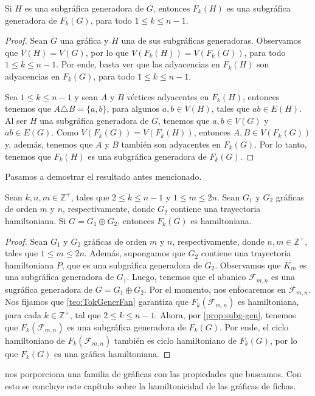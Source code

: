 \begin{proposicion}
\label{prop:subg-gen}
    Si $H$ es una subgr\'afica generadora de $G$, entonces $F_k(H)$ es una
    subgr\'afica generadora de $F_k(G)$, para todo $1 \leq k \leq n-1$.
\end{proposicion}

\begin{proof}
    Sean $G$ una gr\'afica y $H$ una de sus subgr\'aficas generadoras.
    Observamos que $V(H)=V(G)$, por lo que $V(F_k(H))=V(F_k(G))$, para todo $1
    \leq k \leq n-1$. Por ende, basta ver que las adyacencias en $F_k(H)$ son
    adyacencias en $F_k(G)$, para todo $1 \leq k \leq n-1$.

    Sea $1 \leq k \leq n-1$ y sean $A$ y $B$ v\'ertices adyacentes en $F_k(H)$,
    entonces tenemos que $ A \triangle B = \{a,b\}$, para algunos $a,b \in
    V(H)$, tales que $ab \in E(H)$. Al ser $H$ una subgr\'afica generadora de
    $G$, tenemos que $a,b \in V(G)$ y $ab \in E(G)$. Como $V(F_k(G))=V(F_k(H))$,
    entonces $A,B \in V(F_k(G))$ y, adem\'as, tenemos que $A$ y $B$ tambi\'en
    son adyacentes en $F_k(G)$. Por lo tanto, tenemos que $F_k(H)$ es una
    subgr\'afica generadora de $F_k(G)$.
\end{proof}

Pasamos a demostrar el resultado antes mencionado.

\begin{corolario}
\label{coro:Token-Join}
    Sean $k,n,m \in \mathbb{Z^{+}}$, tales que $2 \leq k \leq n-1$ y $1 \leq m
    \leq 2n$. Sean $G_1$ y $G_2$ gr\'aficas de orden $m$ y $n$, respectivamente,
    donde $G_2$ contiene una trayectoria hamiltoniana. Si $G = G_1 \oplus G_2$,
    entonces $F_k(G)$ es hamiltoniana. 
\end{corolario}

\begin{proof}
    Sean $G_1$ y $G_2$ gr\'aficas de orden $m$ y $n$, respectivamente, donde
    $n,m \in \mathbb{Z^{+}}$, tales que $1 \leq m \leq 2n$. Adem\'as, supongamos
    que $G_2$ contiene una trayectoria hamiltoniana $P$, que es una subgr\'afica
    generadora de $G_2$. Observamos que $\overline{K_m}$ es una subgr\'afica
    generadora de $G_1$. Luego, tenemos que el abanico $\mathcal{F}_{m,n}$ es
    una sugr\'afica generadora de $G= G_1 \oplus G_2$. Por el momento, nos
    enfocaremos en $\mathcal{F}_{m,n}$. Nos fijamos que \cref{teo:TokGenerFan}
    garantiza que $F_k(\mathcal{F}_{m,n})$ es hamiltoniana, para cada $k \in
    \mathbb{Z^{+}}$, tal que $2 \leq k \leq n-1$. Ahora, por
    \cref{prop:subg-gen}, tenemos que $F_k(\mathcal{F}_{m,n})$ es una
    subgr\'afica generadora de $F_k(G)$. Por ende, el ciclo hamiltoniano de
    $F_k(\mathcal{F}_{m,n})$ tambi\'en es ciclo hamiltoniano de $F_k(G)$, por lo
    que $F_k(G)$ es una gr\'afica hamiltoniana.
\end{proof}

 nos porporciona una familia de gr\'aficas con las
propiedades que buscamos. Con esto se concluye este cap\'itulo sobre la
hamiltonicidad de las gr\'aficas de fichas.
